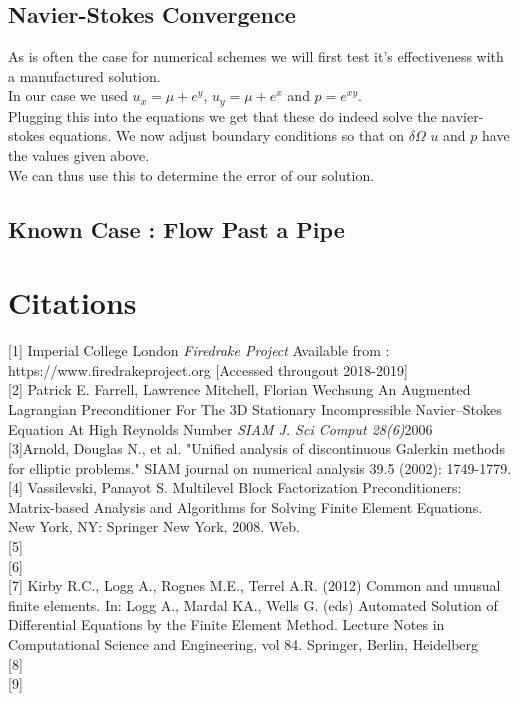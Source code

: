 \documentclass[11pt,twoside,a4paper]{article}
\begin{document}
\subsection{Navier-Stokes Convergence}

As is often the case for numerical schemes we will first test it's effectiveness with a manufactured solution.\\
In our case we used $u_x = \mu  + e^y$, $u_y = \mu + e^x$ and $p = e^{xy}$.\\
Plugging this into the equations we get that these do indeed solve the navier-stokes equations. We now adjust boundary conditions so that on $\delta \Omega$ $u$ and $p$ have the values given above.\\
We can thus use this to determine the error of our solution.

\subsection{Known Case : Flow Past a Pipe}
\section{Citations}

[1] Imperial College London \textit{Firedrake Project} Available from : https://www.firedrakeproject.org [Accessed througout 2018-2019]\\

[2] Patrick E. Farrell, Lawrence Mitchell, Florian Wechsung
 An Augmented Lagrangian Preconditioner For The 3D Stationary Incompressible Navier–Stokes Equation At High Reynolds Number
\textit{SIAM J. Sci Comput 28(6)}2006\\

[3]Arnold, Douglas N., et al. "Unified analysis of discontinuous Galerkin methods for elliptic problems." SIAM journal on numerical analysis 39.5 (2002): 1749-1779.\\

[4] Vassilevski, Panayot S. Multilevel Block Factorization Preconditioners: Matrix-based Analysis and Algorithms for Solving Finite Element Equations. New York, NY: Springer New York, 2008. Web.\\

[5]\\

[6]\\

[7]  Kirby R.C., Logg A., Rognes M.E., Terrel A.R. (2012) Common and unusual finite elements. In: Logg A., Mardal KA., Wells G. (eds) Automated Solution of Differential Equations by the Finite Element Method. Lecture Notes in Computational Science and Engineering, vol 84. Springer, Berlin, Heidelberg\\

[8]\\

[9]
\end{document}
